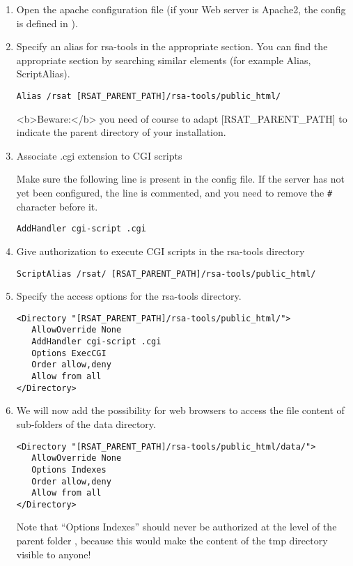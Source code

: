 \documentclass[12pt,a4paper, twoside]{scrreprt} %
\begin{document}
\begin{enumerate}
\item Open the apache configuration file (if your Web server is
  Apache2, the config is defined in ).

\item Specify an alias for rsa-tools in the appropriate section. You
  can find the appropriate section by searching similar elements (for
  example Alias, ScriptAlias).

\begin{lstlisting}
Alias /rsat [RSAT_PARENT_PATH]/rsa-tools/public_html/
\end{lstlisting}

<b>Beware:</b> you need of course to adapt [RSAT\_PARENT\_PATH] to
indicate the parent directory of your \RSAT installation.

\item Associate .cgi extension to CGI scripts

Make sure the following line is present in the config file. If the
server has not yet been configured, the line is commented, and you
need to remove the \texttt{\#} character before it.

\begin{lstlisting}
AddHandler cgi-script .cgi
\end{lstlisting}

\item Give authorization to execute CGI scripts in the rsa-tools directory

\begin{lstlisting}
ScriptAlias /rsat/ [RSAT_PARENT_PATH]/rsa-tools/public_html/
\end{lstlisting}

\item Specify the access options for the rsa-tools directory.

\begin{lstlisting}
<Directory "[RSAT_PARENT_PATH]/rsa-tools/public_html/">
   AllowOverride None
   AddHandler cgi-script .cgi
   Options ExecCGI
   Order allow,deny
   Allow from all
</Directory>
\end{lstlisting}

\item We will now add the possibility for web browsers to access the file
  content of sub-folders of the data directory. 


\begin{lstlisting}
<Directory "[RSAT_PARENT_PATH]/rsa-tools/public_html/data/">
   AllowOverride None
   Options Indexes
   Order allow,deny
   Allow from all
</Directory>
\end{lstlisting}

  Note that ``Options Indexes'' should never be authorized at the level of the
  parent folder , because this would make the content of the tmp
  directory visible to anyone!

\end{enumerate}
\end{document}
